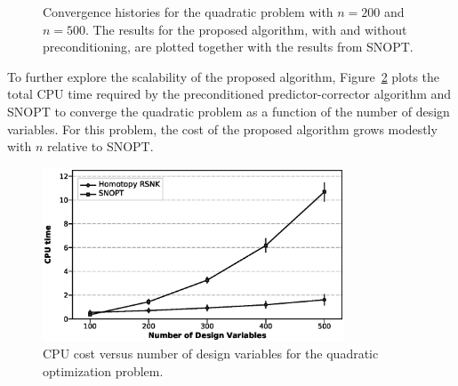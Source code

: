 \begin{figure}[tbp]
  \centering
   \hspace{1em}
   \caption{Convergence histories for the quadratic problem with $n=200$ and
  $n=500$. The results for the proposed algorithm, with and without
  preconditioning, are plotted together with the results from
  SNOPT.\label{fig:quad_hist}}
\end{figure}


To further explore the scalability of the proposed algorithm,
Figure~\ref{fig:quad_scale} plots the total CPU time required by the
preconditioned predictor-corrector algorithm and SNOPT to converge the quadratic
problem as a function of the number of design variables.  For this problem, the
cost of the proposed algorithm grows modestly with $n$ relative to SNOPT.

\begin{figure}[tbp]
  \centering
  \includegraphics[clip,width=0.8\textwidth]{./figs/newres2/quadratic_random_100.eps}%
  \caption{CPU cost versus number of design variables for the quadratic
    optimization problem.\label{fig:quad_scale}}
\end{figure}










